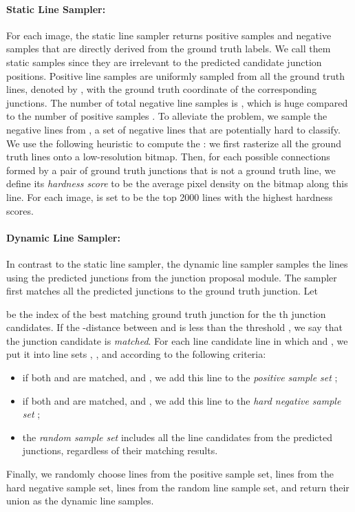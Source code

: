 \documentclass[10pt,twocolumn,letterpaper]{article}
\begin{document}
\paragraph{Static Line Sampler:}
For each image, the static line sampler returns   positive samples and   negative samples that are directly derived from the ground truth labels. We call them static samples since they are irrelevant to the predicted candidate junction positions. 
Positive line samples are uniformly sampled from all the ground truth lines, denoted by , with the ground truth coordinate of the corresponding junctions. 
The number of total negative line samples is , which is huge compared to the number of positive samples . To alleviate the problem, we sample the negative lines from , a set of negative lines that are potentially hard to classify. We use the following heuristic to compute the : we first rasterize all the ground truth lines onto a  low-resolution bitmap. Then, for each possible connections formed by a pair of ground truth junctions that is not a ground truth line, we define its \emph{hardness score} to be the average pixel density on the bitmap along this line. For each image,  is set to be the top 2000 lines with the highest hardness scores.

\paragraph{Dynamic Line Sampler:}
In contrast to the static line sampler, the dynamic line sampler samples the lines using the predicted junctions from the junction proposal module. The sampler first matches all the predicted junctions to the ground truth junction. Let 

be the index of the best matching ground truth junction for the th junction candidates. If the -distance between  and  is less than the threshold , we say that the junction candidate  is \emph{matched}. For each line candidate line  in which  and , we put it into line sets , , and  according to the following criteria:
\begin{itemize}
    \item if both  and  are matched, and , we add this line to the \emph{positive sample set} ;
    \item if both  and  are matched, and , we add this line to the \emph{hard negative sample set} ;
    \item the \emph{random sample set}  includes all the line candidates from the predicted junctions, regardless of their matching results.
\end{itemize}
Finally, we randomly choose  lines from the positive sample set,  lines from the hard negative sample set,  lines from the random line sample set, and return their union as the dynamic line samples.
\end{document}

